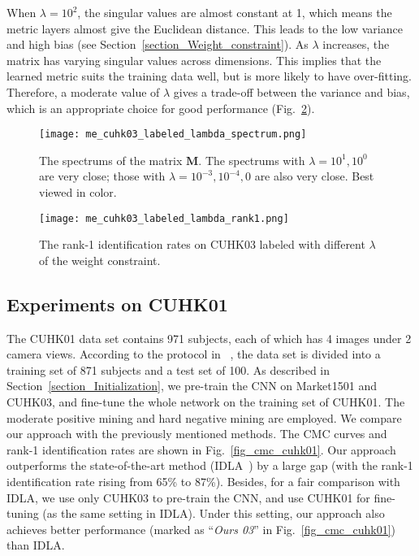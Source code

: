 \documentclass[10pt,twocolumn,letterpaper]{article}
\begin{document}
When $\lambda = 10^2$, the singular values are almost constant at 1, which means the metric layers almost give the Euclidean distance. This leads to the low variance and high bias (see Section~\ref{section_Weight_constraint}).
As $\lambda$ increases, the matrix has varying singular values across dimensions.
This implies that the learned metric suits the training data well, but is more likely to have over-fitting.
Therefore, a moderate value of $\lambda$ gives a trade-off between the variance and bias, which is an appropriate choice for good performance (Fig.~\ref{fig_lambda_rank1}).
\begin{figure}[!htb]
  \centering
  \texttt{[image: me\_cuhk03\_labeled\_lambda\_spectrum.png]}
  \caption{The spectrums of the matrix $\textbf{M}$. The spectrums with $\lambda=10^1, 10^0$ are very close; those with $\lambda=10^{-3}, 10^{-4}, 0$ are also very close. Best viewed in color.}
  \label{fig_lambda_spectrum}
\end{figure}
\begin{figure}[!htb]
  \centering
  \texttt{[image: me\_cuhk03\_labeled\_lambda\_rank1.png]}
  \caption{The rank-1 identification rates on CUHK03 labeled with different $\lambda$ of the weight constraint.}
  \label{fig_lambda_rank1}
\end{figure}



\subsection{Experiments on CUHK01}
\label{section_Experiments_on_CUHK01}

The CUHK01 data set contains 971 subjects, each of which has 4 images under 2 camera views.
According to the protocol in ~\cite{li2012human}, the data set is divided into a training set of 871 subjects and a test set of 100.
As described in Section~\ref{section_Initialization}, we pre-train the CNN on Market1501 and CUHK03, and fine-tune the whole network on the training set of CUHK01.
The moderate positive mining and hard negative mining are employed.
We compare our approach with the previously mentioned methods. The CMC curves and rank-1 identification rates are shown in Fig.~\ref{fig_cmc_cuhk01}.
Our approach outperforms the state-of-the-art method (IDLA~\cite{ahmed2015improved}) by a large gap (with the rank-1 identification rate rising from 65\% to 87\%).
Besides, for a fair comparison with IDLA, we use only CUHK03 to pre-train the CNN, and use CUHK01 for fine-tuning (as the same setting in IDLA).
Under this setting, our approach also achieves better performance (marked as ``\emph{Ours 03}'' in Fig.~\ref{fig_cmc_cuhk01}) than IDLA.
\end{document}
